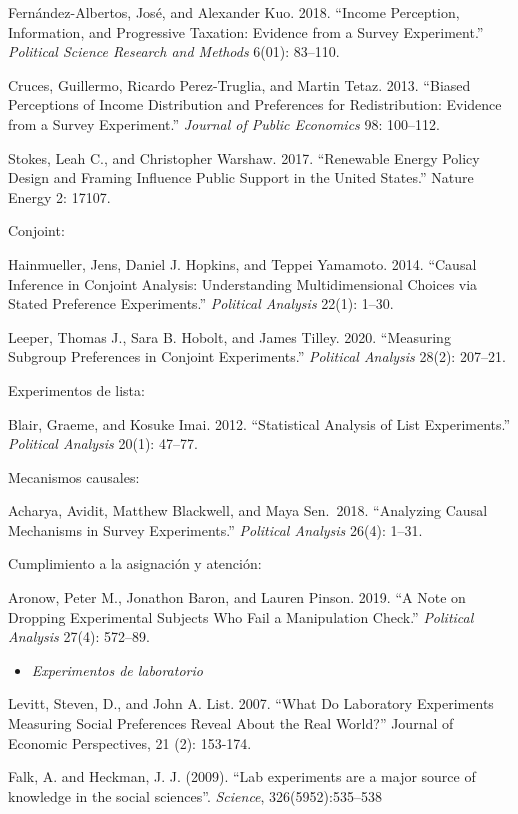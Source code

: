 \documentclass[
  12pt,
]{article}
\providecommand{\tightlist}{%
  \setlength{\itemsep}{0pt}\setlength{\parskip}{0pt}}
\begin{document}
Fernández-Albertos, José, and Alexander Kuo. 2018. ``Income Perception,
Information, and Progressive Taxation: Evidence from a Survey
Experiment.'' \emph{Political Science Research and Methods} 6(01):
83--110.

Cruces, Guillermo, Ricardo Perez-Truglia, and Martin Tetaz. 2013.
``Biased Perceptions of Income Distribution and Preferences for
Redistribution: Evidence from a Survey Experiment.'' \emph{Journal of
Public Economics} 98: 100--112.

Stokes, Leah C., and Christopher Warshaw. 2017. ``Renewable Energy
Policy Design and Framing Influence Public Support in the United
States.'' Nature Energy 2: 17107.

Conjoint:

Hainmueller, Jens, Daniel J. Hopkins, and Teppei Yamamoto. 2014.
``Causal Inference in Conjoint Analysis: Understanding Multidimensional
Choices via Stated Preference Experiments.'' \emph{Political Analysis}
22(1): 1--30.

Leeper, Thomas J., Sara B. Hobolt, and James Tilley. 2020. ``Measuring
Subgroup Preferences in Conjoint Experiments.'' \emph{Political
Analysis} 28(2): 207--21.

Experimentos de lista:

Blair, Graeme, and Kosuke Imai. 2012. ``Statistical Analysis of List
Experiments.'' \emph{Political Analysis} 20(1): 47--77.

Mecanismos causales:

Acharya, Avidit, Matthew Blackwell, and Maya Sen.~2018. ``Analyzing
Causal Mechanisms in Survey Experiments.'' \emph{Political Analysis}
26(4): 1--31.

Cumplimiento a la asignación y atención:

Aronow, Peter M., Jonathon Baron, and Lauren Pinson. 2019. ``A Note on
Dropping Experimental Subjects Who Fail a Manipulation Check.''
\emph{Political Analysis} 27(4): 572--89.

\begin{itemize}
\tightlist
\item
  \emph{Experimentos de laboratorio}
\end{itemize}

Levitt, Steven, D., and John A. List. 2007. ``What Do Laboratory
Experiments Measuring Social Preferences Reveal About the Real World?''
Journal of Economic Perspectives, 21 (2): 153-174.

Falk, A. and Heckman, J. J. (2009). ``Lab experiments are a major source
of knowledge in the social sciences''. \emph{Science},
326(5952):535--538
\end{document}
